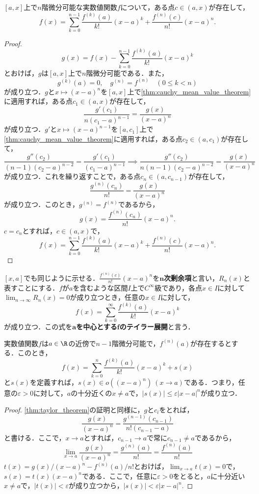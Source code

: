 \documentclass[a4paper,10pt]{ltjsarticle}
\begin{document}
\begin{MyTheorem}
  \([a, x]\)上で\(n\)階微分可能な実数値関数\(f\)について，ある点\(c \in (a, x)\)が存在して，
  \[ f(x) = \sum_{k=0}^{n-1} \frac{f^{(k)}(a)}{k!}(x - a)^k + \frac{f^{(n)}(c)}{n!}(x - a)^n. \]
\end{MyTheorem}
\begin{proof}
  \[ g(x) = f(x) - \sum_{k=0}^{n-1} \frac{f^{(k)}(a)}{k!}(x - a)^k \]
  とおけば，\(g\)は\([a, x]\)上で\(n\)階微分可能である．また，
  \[ g^{(k)}(a) = 0,\quad g^{(n)} = f^{(n)} \quad (0 \le k < n) \]
  が成り立つ．\(g\)と\(x \mapsto (x - a)^n\)を\([a, x]\)上で\cref{thm:cauchy_mean_value_theorem}に適用すれば，ある点\(c_1 \in (a, x)\)が存在して，
  \[ \frac{g'(c_1)}{n(c_1 - a)^{n-1}} = \frac{g(x)}{(x - a)^n} \]
  が成り立つ．\(g'\)と\(x \mapsto (x - a)^{n-1}\)を\([a, c_1]\)上で\cref{thm:cauchy_mean_value_theorem}に適用すれば，ある点\(c_2 \in (a, c_1)\)が存在して，
  \[ \frac{g''(c_2)}{(n-1)(c_2 - a)^{n-2}} = \frac{g'(c_1)}{(c_1 - a)^{n-1}} \implies \frac{g''(c_2)}{n(n-1)(c_2 - a)^{n-2}} = \frac{g(x)}{(x - a)^n} \]
  が成り立つ．これを繰り返すことで，ある点\(c_{n} \in (a, c_{n-1})\)が存在して，
  \[ \frac{g^{(n)}(c_{n})}{n!} = \frac{g(x)}{(x - a)^n} \]
  が成り立つ．このとき，\(g^{(n)} = f^{(n)}\)であるから，
  \[ g(x) = \frac{f^{(n)}(c_{n})}{n!}(x - a)^n. \]
  \(c = c_{n}\)とすれば，\(c \in (a, x)\)で，
  \[ f(x) = \sum_{k=0}^{n-1} \frac{f^{(k)}(a)}{k!}(x - a)^k + \frac{f^{(n)}(c)}{n!}(x - a)^n. \]
\end{proof}
\([x, a]\)でも同じように示せる．\(\frac{f^{(n)}(c)}{n!}(x - a)^n\)を\textbf{\(\bm n\)次剰余項}と言い，\(R_n(x)\)と表すことにする．\(f\)が\(a\)を含むような区間\(I\)上で\(C^\infty\)級であり，各点\(x\in I\)に対して\(\lim_{n\to\infty}R_n(x)=0\)が成り立つとき，任意の\(x\in I\)に対して，
\[ f(x) = \sum_{k=0}^{\infty} \frac{f^{(k)}(a)}{k!}(x - a)^k \]
が成り立つ．この式を\textbf{\(\bm a\)を中心とする\(\bm f\)のテイラー展開}と言う．

\begin{MyTheorem}
  実数値関数\(f\)は\(a\in\R\)の近傍で\(n-1\)階微分可能で，\(f^{(n)}(a)\)が存在するとする．このとき，
  \[ f(x) = \sum_{k=0}^{n}\frac{f^{(k)}(a)}{k!}(x - a)^k + s(x) \]
  と\(s(x)\)を定義すれば，\(s(x) \in o((x-a)^n) \ (x \to a)\)である．つまり，任意の\(\varepsilon > 0\)に対して，\(a\)の十分近くの\(x\ne a\)で，\(|s(x)| \le \varepsilon|x-a|^n\)が成り立つ．
\end{MyTheorem}
\begin{proof}
  \cref{thm:taylor_theorem}の証明と同様に，\(g\)と\(c_i\)をとれば，
  \[ \frac{g(x)}{(x - a)^n} = \frac{g^{(n-1)}(c_{n-1})}{n!(c_{n-1} - a)} \]
  と書ける．ここで，\(x\to a\)とすれば，\(c_{n-1}\to a\)で常に\(c_{n-1}\ne a\)であるから，
  \[ \lim_{x\to a} \frac{g(x)}{(x - a)^n} = \frac{g^{(n)}(a)}{n!} = \frac{f^{(n)}(a)}{n!} \]
  \(t(x) = g(x)/(x-a)^n - f^{(n)}(a)/n!\)とおけば，\(\lim_{x\to a}t(x)=0\)で，\(s(x)=t(x)(x-a)^n\)である．ここで，任意に\(\varepsilon > 0\)をとると，\(a\)に十分近い\(x\ne a\)で，\(|t(x)| < \varepsilon\)が成り立つから，\(|s(x)| < \varepsilon|x-a|^n\).
\end{proof}
\end{document}
